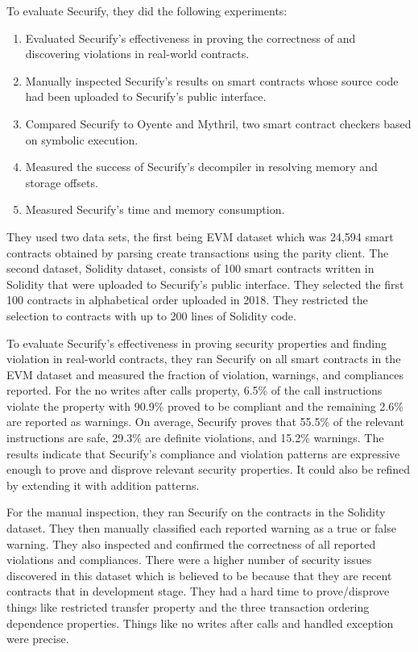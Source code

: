 \documentclass{article}
\begin{document}
To evaluate Securify, they did the following experiments:
\begin{enumerate}
    \item Evaluated Securify's effectiveness in proving the correctness of and discovering violations in real-world contracts.
    \item Manually inspected Securify's results on smart contracts whose source code had been uploaded to Securify's public interface.
    \item Compared Securify to Oyente and Mythril, two smart contract checkers based on symbolic execution.
    \item Measured the success of Securify's decompiler in resolving memory and storage offsets.
    \item Measured Securify's time and memory consumption.
\end{enumerate}
They used two data sets, the first being EVM dataset which was 24,594 smart contracts obtained by parsing create transactions using the parity client. The second dataset, Solidity dataset, consists of 100 smart contracts written in Solidity that were uploaded to Securify's public interface. They selected the first 100 contracts in alphabetical order uploaded in 2018. They restricted the selection to contracts with up to 200 lines of Solidity code. 

To evaluate Securify's effectiveness in proving security properties and finding violation in real-world contracts, they ran Securify on all smart contracts in the EVM dataset and measured the fraction of violation, warnings, and compliances reported. For the no writes after calls property, 6.5\% of the call instructions violate the property with 90.9\% proved to be compliant and the remaining 2.6\% are reported as warnings. On average, Securify proves that 55.5\% of the relevant instructions are safe, 29.3\% are definite violations, and 15.2\% warnings. The results indicate that Securify's compliance and violation patterns are expressive enough to prove and disprove relevant security properties. It could also be refined by extending it with addition patterns.


For the manual inspection, they ran Securify on the contracts in the Solidity dataset. They then manually classified each reported warning as a true or false warning. They also inspected and confirmed the correctness of all reported violations and compliances. There were a higher number of security issues discovered in this dataset which is believed to be because that they are recent contracts that in development stage. They had a hard time to prove/disprove things like restricted transfer property and the three transaction ordering dependence properties. Things like no writes after calls and handled exception were precise. 
\end{document}
